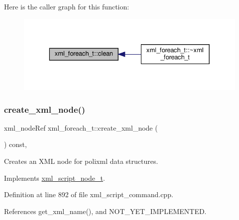 Here is the caller graph for this function\+:
\nopagebreak
\begin{figure}[H]
\begin{center}
\leavevmode
\includegraphics[width=329pt]{d1/dc9/structxml__foreach__t_a62c4df007dbccbb16e471905c3a64826_icgraph}
\end{center}
\end{figure}
\mbox{\label{structxml__foreach__t_a6056d8114277e5aad52bf31408bd24a2}} 
\subsubsection{\texorpdfstring{create\+\_\+xml\+\_\+node()}{create\_xml\_node()}}
{\footnotesize\ttfamily xml\+\_\+node\+Ref xml\+\_\+foreach\+\_\+t\+::create\+\_\+xml\+\_\+node (\begin{DoxyParamCaption}{ }\end{DoxyParamCaption}) const\hspace{0.3cm}{\ttfamily [override]}, {\ttfamily [virtual]}}



Creates an X\+ML node for polixml data structures. 



Implements \hyperlink{classxml__script__node__t_adaf9c51a079c4617f3845c6133eb477f}{xml\+\_\+script\+\_\+node\+\_\+t}.



Definition at line 892 of file xml\+\_\+script\+\_\+command.\+cpp.



References get\+\_\+xml\+\_\+name(), and N\+O\+T\+\_\+\+Y\+E\+T\+\_\+\+I\+M\+P\+L\+E\+M\+E\+N\+T\+ED.

